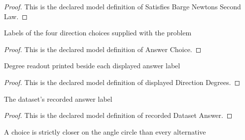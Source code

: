 \begin{proof}
  This is the declared model definition of Satisfies Barge Newtons Second Law.
\end{proof}
\begin{definition}
  \label{def:physics:phyx-mini-0760:phyxminiproblems-problemphyxmini0760-answerchoice}
  Labels of the four direction choices supplied with the problem
\end{definition}
\begin{proof}
  This is the declared model definition of Answer Choice.
\end{proof}
\begin{definition}
  \label{def:physics:phyx-mini-0760:phyxminiproblems-problemphyxmini0760-displayeddirectiondegrees}
  Degree readout printed beside each displayed answer label
\end{definition}
\begin{proof}
  This is the declared model definition of displayed Direction Degrees.
\end{proof}
\begin{definition}
  \label{def:physics:phyx-mini-0760:phyxminiproblems-problemphyxmini0760-recordeddatasetanswer}
  The dataset's recorded answer label
\end{definition}
\begin{proof}
  This is the declared model definition of recorded Dataset Answer.
\end{proof}
\begin{definition}
  \label{def:physics:phyx-mini-0760:phyxminiproblems-problemphyxmini0760-isuniqueclosestdisplayeddirection}
  A choice is strictly closer on the angle circle than every alternative
\end{definition}
